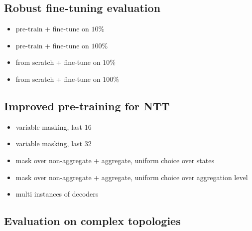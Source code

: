 \subsection{Robust fine-tuning evaluation}
\label{ssec:robeval}

\begin{itemize}
\item pre-train + fine-tune on $10 \%$  
\item pre-train + fine-tune on  $100 \%$  
\item from scratch + fine-tune on $10 \%$  
\item from scratch + fine-tune on $100 \%$  
\end{itemize}

\subsection{Improved pre-training for NTT}
\label{ssec:impptt}

\begin{itemize}
\item variable masking, last 16
\item variable masking, last 32
\item mask over non-aggregate + aggregate, uniform choice over states
\item mask over non-aggregate + aggregate, uniform choice over aggregation level 
\item multi instances of decoders 
\end{itemize}

\subsection{Evaluation on complex topologies}
\label{ssec:comptop}



